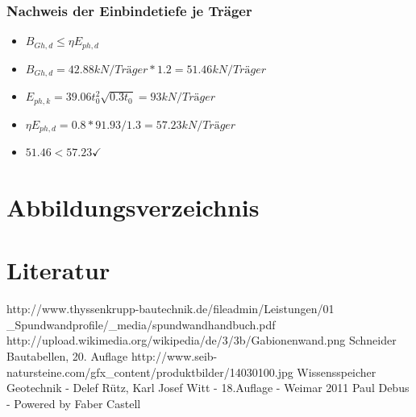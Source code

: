 \documentclass[11pt,fleqn,a4paper,halfparskip]{article}
\begin{document}
\subsubsection*{Nachweis der Einbindetiefe je Träger}
\begin{itemize}
\item[] $B_{Gh,d} \le \eta E_{ph,d}$
\item[] $B_{Gh,d} = 42.88kN/Träger * 1.2 = 51.46kN/Träger$
\item[] $E_{ph,k} =  39.06t_0^2\sqrt{0.3t_0} = 93kN/Träger $
\item[] $\eta E_{ph,d} = 0.8* 91.93/1.3 = 57.23kN/Träger$
\item[] $51.46 < 57.23 \checkmark$
\end{itemize}



\newpage
\section{Abbildungsverzeichnis}
\listoffigures
\newpage
\section{Literatur}
\begin{thebibliography}{9}
http://www.thyssenkrupp-bautechnik.de/fileadmin/Leistungen/01 \_Spundwandprofile/\_media/spundwandhandbuch.pdf
 http://upload.wikimedia.org/wikipedia/de/3/3b/Gabionenwand.png
 Schneider Bautabellen, 20. Auflage
 http://www.seib-natursteine.com/gfx\_content/produktbilder/14030100.jpg
 Wissensspeicher Geotechnik - Delef Rütz, Karl Josef Witt - 18.Auflage - Weimar 2011
 Paul Debus - Powered by Faber Castell
\end{thebibliography}
\end{document}
